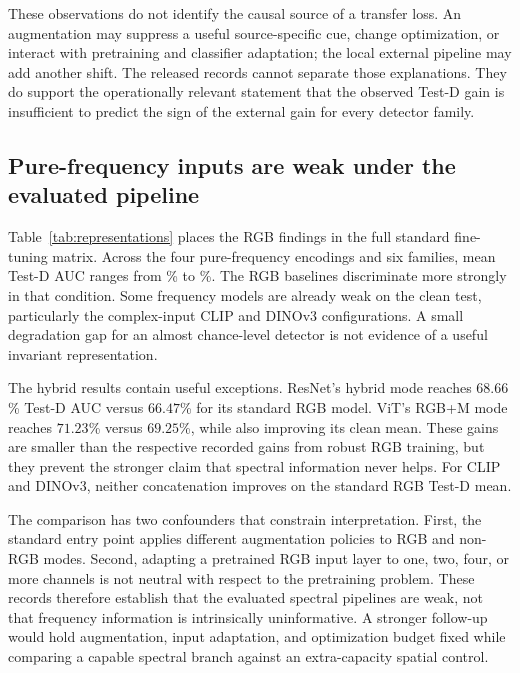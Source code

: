 \documentclass[conference,10pt,letterpaper]{IEEEtran}
\begin{document}
These observations do not identify the causal source of a transfer loss. An augmentation may suppress a useful source-specific cue, change optimization, or interact with pretraining and classifier adaptation; the local external pipeline may add another shift. The released records cannot separate those explanations. They do support the operationally relevant statement that the observed Test-D gain is insufficient to predict the sign of the external gain for every detector family.

\subsection{Pure-frequency inputs are weak under the evaluated pipeline}
Table~\ref{tab:representations} places the RGB findings in the full standard fine-tuning matrix. Across the four pure-frequency encodings and six families, mean Test-D AUC ranges from \PureMinimum{}\% to \PureMaximum{}\%. The RGB baselines discriminate more strongly in that condition. Some frequency models are already weak on the clean test, particularly the complex-input CLIP and DINOv3 configurations. A small degradation gap for an almost chance-level detector is not evidence of a useful invariant representation.

\begin{table}[t]
\caption{The complete standard representation matrix: clean-test / Test-D mean AUC (\%) over the primary five seeds. RGB+M concatenates RGB and FFT magnitude; Hybrid is the release's multi-map spatial--spectral mode. This is a comparison of released pipelines, not an augmentation-matched factorial ablation. Per-seed values and SDs remain available in the analysis export.}
\label{tab:representations}
\centering
\footnotesize
\setlength{\tabcolsep}{5pt}

\end{table}

The hybrid results contain useful exceptions. ResNet's hybrid mode reaches $68.66$\% Test-D AUC versus $66.47$\% for its standard RGB model. ViT's RGB+M mode reaches $71.23$\% versus $69.25$\%, while also improving its clean mean. These gains are smaller than the respective recorded gains from robust RGB training, but they prevent the stronger claim that spectral information never helps. For CLIP and DINOv3, neither concatenation improves on the standard RGB Test-D mean.

The comparison has two confounders that constrain interpretation. First, the standard entry point applies different augmentation policies to RGB and non-RGB modes. Second, adapting a pretrained RGB input layer to one, two, four, or more channels is not neutral with respect to the pretraining problem. These records therefore establish that the evaluated spectral pipelines are weak, not that frequency information is intrinsically uninformative. A stronger follow-up would hold augmentation, input adaptation, and optimization budget fixed while comparing a capable spectral branch against an extra-capacity spatial control.
\end{document}
